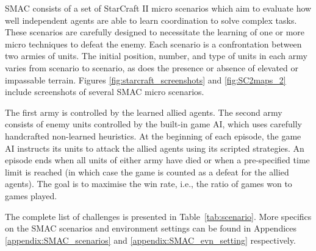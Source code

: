\documentclass[twoside,11pt]{article}
\begin{document}
SMAC consists of a set of StarCraft II micro scenarios which aim to evaluate how well independent agents are able to learn coordination to solve complex tasks. 
These scenarios are carefully designed to necessitate the learning of one or more micro techniques to defeat the enemy.
Each scenario is a confrontation between two armies of units.
The initial position, number, and type of units in each army varies from scenario to scenario, as does the presence or absence of elevated or impassable terrain. Figures \ref{fig:starcraft_screenshots}  and \ref{fig:SC2maps_2} include screenshots of several SMAC micro scenarios.

The first army is controlled by the learned allied agents.
The second army consists of enemy units controlled by the built-in game AI, which uses carefully handcrafted non-learned heuristics.
At the beginning of each episode, the game AI instructs its units to attack the allied agents using its scripted strategies.
An episode ends when all units of either army have died or when a pre-specified time limit is reached (in which case the game is counted as a defeat for the allied agents).
The goal is to maximise the win rate, i.e., the ratio of games won to games played.

The complete list of challenges is presented in Table~\ref{tab:scenario}. More specifics on the SMAC scenarios and environment settings can be found in Appendices \ref{appendix:SMAC_scenarios} and \ref{appendix:SMAC_evn_setting} respectively.
\end{document}
